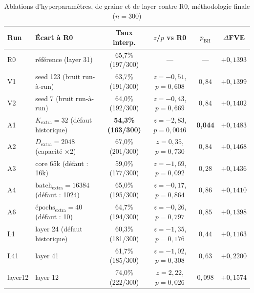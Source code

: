 \documentclass[11pt]{article}
\begin{document}
\begin{table}[h!]
\centering
\caption{Ablations d'hyperparamètres, de graine et de layer contre R0, méthodologie finale ($n=300$)}
\label{tab:ablations-finales}
\vspace{0.4em}\small
\begin{tabular}{@{}llcccc@{}}
\toprule
\textbf{Run} & \textbf{Écart à R0} & \textbf{Taux interp.} & \textbf{$z$/$p$ vs R0} & \textbf{$p_\text{BH}$} & \textbf{$\Delta$FVE} \\ \midrule
R0 & référence (layer 31) & 65,7\% (197/300) & --- & --- & $+0{,}1393$ \\
V1 & seed 123 (bruit run-à-run) & 63,7\% (191/300) & $z=-0{,}51$, $p=0{,}608$ & $0{,}84$ & $+0{,}1399$ \\
V2 & seed 7 (bruit run-à-run) & 64,0\% (192/300) & $z=-0{,}43$, $p=0{,}669$ & $0{,}84$ & $+0{,}1402$ \\
A1 & $K_\text{extra}=32$ (défaut historique) & \textbf{54,3\% (163/300)} & $z=-2{,}83$, $p=0{,}0046$ & \textbf{0,044} & $+0{,}1483$ \\
A2 & $D_\text{extra}=2048$ (capacité $\times$2) & 67,0\% (201/300) & $z=0{,}35$, $p=0{,}730$ & $0{,}84$ & $+0{,}1468$ \\
A3 & core 65k (défaut : 16k) & 59,0\% (177/300) & $z=-1{,}69$, $p=0{,}092$ & $0{,}28$ & $+0{,}1436$ \\
A4 & $\text{batch}_\text{extra}=16384$ (défaut : 1024) & 65,0\% (195/300) & $z=-0{,}17$, $p=0{,}864$ & $0{,}86$ & $+0{,}1410$ \\
A6 & $\text{épochs}_\text{extra}=40$ (défaut : 10) & 64,7\% (194/300) & $z=-0{,}26$, $p=0{,}797$ & $0{,}85$ & $+0{,}1398$ \\
L1 & layer 24 (défaut historique) & 60,3\% (181/300) & $z=-1{,}35$, $p=0{,}176$ & $0{,}44$ & $+0{,}1163$ \\
L41 & layer 41 & 61,7\% (185/300) & $z=-1{,}02$, $p=0{,}308$ & $0{,}63$ & $+0{,}2200$ \\
layer12 & layer 12 & 74,0\% (222/300) & $z=2{,}22$, $p=0{,}026$ & $0{,}098$ & $+0{,}1574$ \\
\bottomrule
\end{tabular}
\end{table}
\end{document}
